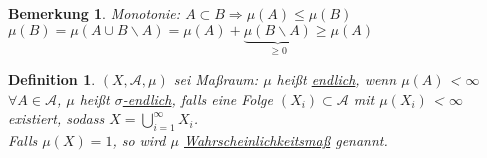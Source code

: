 \documentclass[11pt]{memoir}
\theoremstyle{break}
\newtheorem{Definition}{Definition}[chapter]
\newtheorem{Bemerkung}{Bemerkung}[chapter]
\begin{document}
\begin{Bemerkung}
Monotonie: $A \subset B \Rightarrow \mu(A) \leq \mu(B)$\\
$\mu(B) = \mu(A \cup B\backslash A) = \mu(A) + \underbrace{\mu(B\backslash A)}_{\geq 0}\geq \mu(A)$
\end{Bemerkung}

\begin{Definition}
$(X, \mathscr{A}, \mu)$ sei Maßraum: $\mu$ heißt \underline{endlich}, wenn $\mu(A)$ \textless {} $ \infty $ $\forall A \in \mathscr{A}$, $\mu$ heißt \underline{$\sigma$-endlich}, falls eine Folge $(X_i) \subset \mathscr{A}$ mit $\mu(X_i)$ \textless {} $ \infty $ existiert, sodass $X = \bigcup\limits_{i=1}^{\infty} X_i$. \\
Falls $\mu(X) = 1$, so wird $\mu$ \underline{Wahrscheinlichkeitsmaß} genannt.
\end{Definition}
\end{document}
